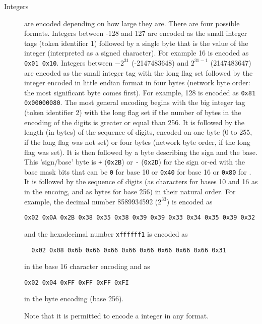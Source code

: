 \begin{description}
\item[Integers] are encoded depending on how large they
      are. There are four possible formats.  Integers between -128 and 127 are
      encoded as the small integer tags (token
	identifier 1) followed by a single byte that is the 
      value of the integer (interpreted as a signed character). For
      example 16 is encoded as \lstinline|0x01 0x10|.  Integers between
      $-2^{31}$  (-2147483648) and $2^{31-1}$  (2147483647) are encoded as
      the small integer tag with the long flag set followed by the integer
      encoded in little endian format in four bytes (network byte order:
      the most significant byte comes first). For example, 128 is encoded
      as \lstinline|0x81| \lstinline|0x00000080|.  The most
      general encoding begins 
      with the big integer tag (token identifier 2) with the long flag set
      if the number of bytes in the encoding of the digits is greater or
      equal than 256. It is followed by the length (in bytes) of the
      sequence of digits, encoded on one byte (0 to 255, if the long flag
      was not set) or four bytes (network byte order, if the long flag was
      set).  It is then followed by a byte describing the sign and the
      base.  This 'sign/base' byte is \lstinline|+|
      (\lstinline|0x2B|) or \lstinline|-|
      (\lstinline|0x2D|) for the sign or-ed with the base mask bits
      that can be \lstinline|0| for base 10 
      or \lstinline|0x40| for base 16 or
	\lstinline|0x80| for .  It is
      followed by the 
      sequence of digits (as 
      characters for bases 10 and 16 as in the \XML
	encoing, and as bytes for base 256) in their natural
      order.  For example, the decimal
	number 8589934592
      ($2^{33}$) is encoded  as
\begin{lstlisting}
0x02 0x0A 0x2B 0x38 0x35 0x38 0x39 0x39 0x33 0x34 0x35 0x39 0x32
\end{lstlisting}
      and the
      hexadecimal number
      \lstinline|xffffff1| is 
      encoded as 
\begin{lstlisting}
  0x02 0x08 0x6b 0x66 0x66 0x66 0x66 0x66 0x66 0x66 0x31
\end{lstlisting}
in the base 16 character encoding and as 
\begin{lstlisting}
0x02 0x04 0xFF 0xFF 0xFF 0xFI
\end{lstlisting}
in the byte encoding (base 256).

Note that it is permitted to encode a  integer in any 
format.


\end{description}
